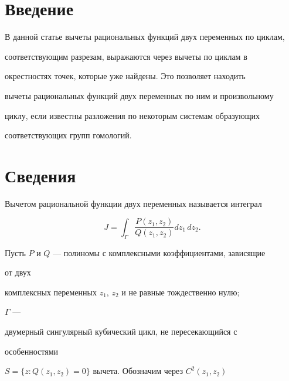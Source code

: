 

\maketitle 


\label{begin} 


 


 


\section*{Введение} 


 


В данной статье вычеты рациональных функций двух переменных по циклам,  


соответствующим разрезам, выражаются через вычеты по циклам в 


окрестностях точек, которые уже найдены. Это позволяет находить 


вычеты рациональных функций двух переменных по ним и произвольному  


циклу, если известны разложения по некоторым системам образующих 


соответствующих групп гомологий. 


 


\section{Сведения} 


 


Вычетом рациональной функции двух переменных называется интеграл 


$$ 


J=\int_\Gamma\frac{P(z_1,z_2)}{Q(z_1,z_2)}dz_1\,dz_2. 


$$ 


Пусть $P$ и $Q$ --- полиномы с комплексными коэффициентами, зависящие 


от двух  


комплексных переменных $z_1$, $z_2$ и не равные тождественно нулю; 


$\Gamma$ --- 


двумерный сингулярный кубический цикл, не пересекающийся с 


особенностями 


$S=\{z:Q(z_1,z_2)=0\}$ вычета. Обозначим через $C^2(z_1,z_2)$ 


